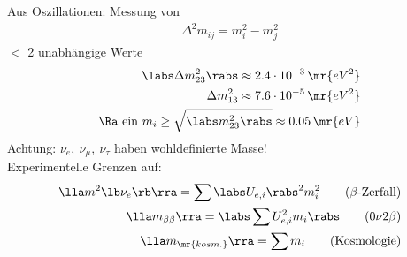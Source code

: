 Aus Oszillationen: Messung von 
\begin{align}
\Delta^2 m_{ij} = m_i^2 - m_j^2
\end{align}
$\lt$ 2 unabhängige Werte
\begin{align}
\labs \Delta m_{23}^2 \rabs \approx 2.4 \cdot 10^{-3}\,\mr{eV^2}\\
\Delta m_{13}^2 \approx 7.6\cdot 10^{-5}\,\mr{eV^2}\\
\Ra \text{ ein } m_i \geq \sqrt{\labs m_{23}^2 \rabs} \approx 0.05\,\mr{eV}
\end{align}
Achtung: $\nu_e, \ \nu_\mu,\ \nu_\tau$ haben  wohldefinierte Masse!\\
Experimentelle Grenzen auf:
\begin{align}
\lla m^2 \lb \nu_e\rb  \rra = \sum \labs U_{e,i} \rabs^2 m_i^2 \qquad (\beta\text{-Zerfall})\\
\lla m_{\beta\beta} \rra = \labs \sum U_{e,i}^2 m_i \rabs \qquad (0\nu 2\beta)\\
\lla m_\mr{kosm.} \rra = \sum m_i \qquad (\text{Kosmologie})
\end{align}
